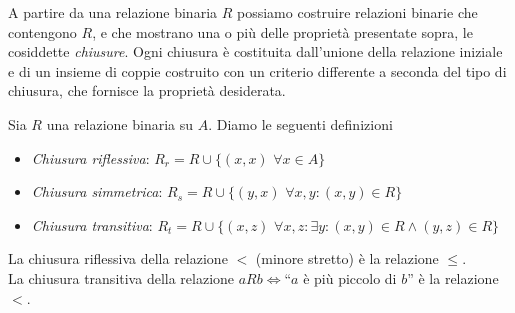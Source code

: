A partire da una relazione binaria $R$ possiamo costruire relazioni binarie che contengono $R$, e che mostrano una o più delle proprietà presentate sopra, le cosiddette \emph{chiusure}.
Ogni chiusura è costituita dall'unione della relazione iniziale e di un insieme di coppie costruito con un criterio differente a seconda del tipo di chiusura, che fornisce la proprietà desiderata.
\begin{definition}
	Sia $R$ una relazione binaria su $A$.
    Diamo le seguenti definizioni
    \begin{itemize}
        \item \emph{Chiusura riflessiva}: $R_r = R \cup \{(x,x) \,\, \forall x \in A\}$
        \item \emph{Chiusura simmetrica}: $R_s = R \cup \{(y,x) \,\, \forall x,y : (x,y) \in R\}$
        \item \emph{Chiusura transitiva}: $R_t = R \cup \{(x,z) \,\, \forall x,z : \exists y : (x,y) \in R \land (y,z) \in R\}$
    \end{itemize}
\end{definition}
\begin{example}
    La chiusura riflessiva della relazione $<$ (minore stretto) è la relazione $\leq$.\\
    La chiusura transitiva della relazione $a R b \iff $``$a$ è più piccolo di $b$'' è la relazione $<$.
\end{example}

